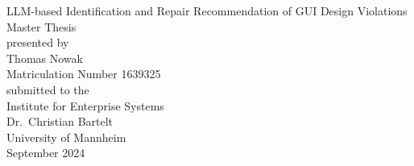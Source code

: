 \documentclass[11pt,titlepage,oneside,openany]{book}
\begin{document}
\frontmatter
{}
\begin{titlepage}
	\vspace*{2cm}
	\begin{center}
		{\Large LLM-based Identification and Repair Recommendation of GUI Design Violations\\}
		\vspace{2cm} 
		{Master Thesis\\}
		\vspace{2cm}
		{presented by\\
			Thomas Nowak \\
			Matriculation Number 1639325\\
		}
		\vspace{1cm} 
		{submitted to the\\
			Institute for Enterprise Systems\\
			Dr.\ Christian Bartelt\\
			University of Mannheim\\} \vspace{2cm}
		{September 2024}
	\end{center}
\end{titlepage} 
\end{document}
